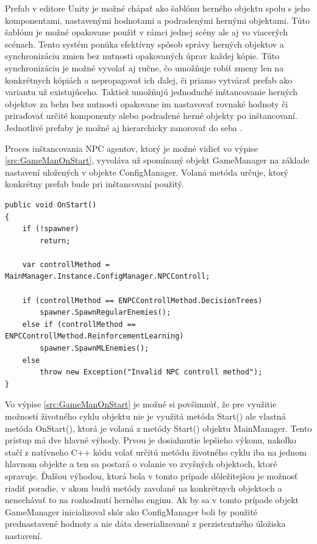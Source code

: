 \documentclass[slovak, master]{diploma}
\begin{document}
Prefab v editore Unity je možné chápať ako šablónu herného objektu spolu s jeho komponentami, nastavenými hodnotami a podradenými hernými objektami. Túto šablónu je možné opakovane použiť v rámci jednej scény ale aj vo viacerých scénach. Tento systém ponúka efektívny spôsob správy herných objektov a synchronizáciu zmien bez nutnosti opakovaných úprav každej kópie. Túto synchronizáciu je možné vyvolať aj ručne, čo umožňuje robiť zmeny len na konkrétnych kópiách a nepropagovať ich ďalej, či priamo vytvárať prefab ako variantu už existujúceho. Taktiež umožňujú jednoduché inštancovanie herných objektov za behu bez nutnosti opakovane im nastavovať rovnaké hodnoty či priraďovať určité komponenty alebo podradené herné objekty po inštancovaní. Jednotlivé prefaby je možné aj hierarchicky zanorovať do seba \cite{Prefabs}.

Proces inštancovania NPC agentov, ktorý je možné vidieť vo výpise \ref{src:GameManOnStart}, vyvoláva už spomínaný objekt GameManager na základe nastavení uložených v objekte ConfigManager. Volaná metóda určuje, ktorý konkrétny prefab bude pri inštancovaní použitý.

\vspace{8pt}
\begin{lstlisting}[label=src:GameManOnStart,caption={Inštancovanie NPC agentov v závislosti od nastavení}]
public void OnStart() 
{
    if (!spawner)
        return;

    var controllMethod = MainManager.Instance.ConfigManager.NPCControll;

    if (controllMethod == ENPCControllMethod.DecisionTrees)
        spawner.SpawnRegularEnemies();
    else if (controllMethod == ENPCControllMethod.ReinforcementLearning)
        spawner.SpawnMLEnemies();
    else
        throw new Exception("Invalid NPC controll method");
}
\end{lstlisting}

Vo výpise \ref{src:GameManOnStart} je možné si povšimnúť, že pre využitie možností životného cyklu objektu nie je využitá metóda Start() ale vlastná metóda OnStart(), ktorá je volaná z metódy Start() objektu MainManager. Tento prístup má dve hlavné výhody. Prvou je dosiahnutie lepšieho výkonu, nakoľko stačí z natívneho C++ kódu volať určitú metódu životného cyklu iba na jednom hlavnom objekte a ten sa postará o volanie vo zvyšných objektoch, ktoré spravuje. Ďalšou výhodou, ktorá bola v tomto prípade dôležitejšou je možnosť riadiť poradie, v akom budú metódy zavolané na konkrétnych objektoch a nenechávať to na rozhodnutí herného enginu. Ak by sa v tomto prípade objekt GameManager inicializoval skôr ako ConfigManager boli by použité prednastavené hodnoty a nie dáta deserializované z perzistentného úložiska nastavení. 
\end{document}

